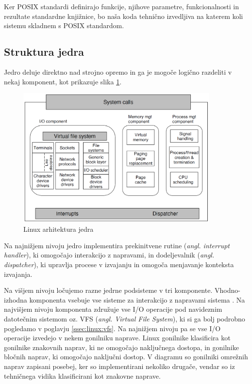 \documentclass[a4paper,12pt,openright]{book}
\begin{document}
Ker POSIX standardi definirajo funkcije, njihove parametre, funkcionalnosti in rezultate standardne knjižnice, bo naša koda tehnično izvedljiva na katerem koli sistemu skladnem s POSIX standardom.

\subsection{Struktura jedra}

Jedro deluje direktno nad strojno opremo in ga je mogoče logično razdeliti v nekaj komponent, kot prikazuje slika \ref{fig:linux_kernel_architecture}.

\begin{figure}[h!]
	\begin{center}
		\includegraphics[width=0.9\textwidth]{images/linux_kernel_structure.png}
	\end{center}
	\caption{Linux arhitektura jedra \cite{Tanenbaum_Bos_2023}}
	\label{fig:linux_kernel_architecture}
\end{figure}

Na najnižjem nivoju jedro implementira prekinitvene rutine (\textit{angl. interrupt handler}), ki omogočajo interakcijo z napravami, 
in dodeljevalnik (\textit{angl. dispatcher}), ki upravlja procese v izvajanju in omogoča menjavanje konteksta izvajanja.

Na višjem nivoju ločujemo razne jedrne podsisteme v tri komponente.
Vhodno-izhodna komponenta vsebuje vse sisteme za interakcijo z napravami sistema \cite{Tanenbaum_Bos_2023}.
Na najvišjem nivoju komponenta združuje vse I/O operacije pod navideznim datotečnim sistemom oz. VFS (\textit{angl. Virtual File System}), ki si ga bolj podrobno pogledamo v poglavju \ref{ssec:linux:vfs}.
Na najnižjem nivoju pa se vse I/O operacije izvedejo v nekem gonilniku naprave.
Linux gonilnike klasificira kot gonilnike znakovnih naprav, ki ne omogočajo naključnega dostopa, in gonilnike bločnih naprav, ki omogočajo naključni dostop.
V diagramu so gonilniki omrežnih naprav zapisani posebej, ker so implementirani nekoliko drugače, vendar so iz tehničnega vidika klasificirani kot znakovne naprave.
\end{document}

